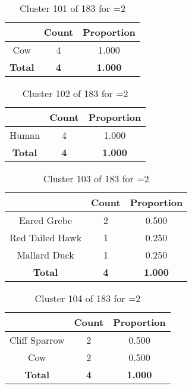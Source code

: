 \begin{table}[ht!]
\centering
\begin{tabular}{|c|c|c|}
\hline
\bf \Spec{} &\bf Count &\bf Proportion\\ \hline \hline
Cow & 4 & 1.000\\ \hline
\hline
\bf Total & \bf 4 & \bf 1.000\\ \hline
\end{tabular}
\label{tab:cluster:101:2}
\caption{Cluster 101 of 183 for \minneigh{}=2}
\end{table}

\begin{table}[ht!]
\centering
\begin{tabular}{|c|c|c|}
\hline
\bf \Spec{} &\bf Count &\bf Proportion\\ \hline \hline
Human & 4 & 1.000\\ \hline
\hline
\bf Total & \bf 4 & \bf 1.000\\ \hline
\end{tabular}
\label{tab:cluster:102:2}
\caption{Cluster 102 of 183 for \minneigh{}=2}
\end{table}

\begin{table}[ht!]
\centering
\begin{tabular}{|c|c|c|}
\hline
\bf \Spec{} &\bf Count &\bf Proportion\\ \hline \hline
Eared Grebe & 2 & 0.500\\ \hline
Red Tailed Hawk & 1 & 0.250\\ \hline
Mallard Duck & 1 & 0.250\\ \hline
\hline
\bf Total & \bf 4 & \bf 1.000\\ \hline
\end{tabular}
\label{tab:cluster:103:2}
\caption{Cluster 103 of 183 for \minneigh{}=2}
\end{table}

\begin{table}[ht!]
\centering
\begin{tabular}{|c|c|c|}
\hline
\bf \Spec{} &\bf Count &\bf Proportion\\ \hline \hline
Cliff Sparrow & 2 & 0.500\\ \hline
Cow & 2 & 0.500\\ \hline
\hline
\bf Total & \bf 4 & \bf 1.000\\ \hline
\end{tabular}
\label{tab:cluster:104:2}
\caption{Cluster 104 of 183 for \minneigh{}=2}
\end{table}

